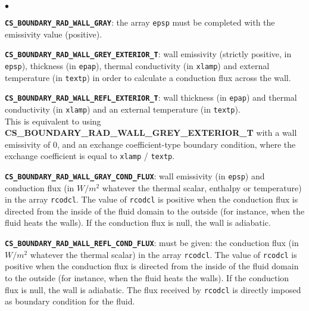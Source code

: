 \begin{list}{$\bullet$}{}

\item \texttt{\textbf{CS\_BOUNDARY\_RAD\_WALL\_GRAY}}: the array \texttt{epsp} must
      be completed with the emissivity value (positive).

\item \texttt{\textbf{CS\_BOUNDARY\_RAD\_WALL\_GREY\_EXTERIOR\_T}}: wall emissivity
      (strictly positive, in \texttt{epsp}), thickness (in \texttt{epap}),
      thermal conductivity (in \texttt{xlamp}) and external temperature
      (in \texttt{textp}) in order to calculate a conduction flux across the wall.

\item \texttt{\textbf{CS\_BOUNDARY\_RAD\_WALL\_REFL\_EXTERIOR\_T}}:
      wall thickness (in \texttt{epap}) and thermal
      conductivity (in \texttt{xlamp}) and an external temperature
      (in \texttt{textp}). \\
      This is equivalent to using \textbf{CS\_BOUNDARY\_RAD\_WALL\_GREY\_EXTERIOR\_T}
      with a wall emissivity of 0, and an exchange coefficient-type boundary
      condition, where the exchange coefficient is equal to
      \texttt{xlamp} / \texttt{textp}.

\item \texttt{\textbf{CS\_BOUNDARY\_RAD\_WALL\_GRAY\_COND\_FLUX}}:
      wall emissivity (in \texttt{epsp}) and conduction
      flux (in $W/m^2$ whatever the thermal scalar, enthalpy or temperature) in
      the array \texttt{rcodcl}. The value of \texttt{rcodcl} is positive when the
      conduction flux is directed from the inside of the fluid domain to the
      outside (for instance, when the fluid heats the walls). If the
      conduction flux is null, the wall is adiabatic.

\item \texttt{\textbf{CS\_BOUNDARY\_RAD\_WALL\_REFL\_COND\_FLUX}}:
      must be given: the conduction flux (in $W/m^2$ whatever the thermal
      scalar) in the array \texttt{rcodcl}. The value of \texttt{rcodcl} is
      positive when the conduction flux is directed from the inside of the
      fluid domain to the outside (for instance, when the fluid heats the
      walls). If the conduction flux is null, the wall is adiabatic. The flux
      received by \texttt{rcodcl} is directly imposed as boundary condition for
      the fluid.

\end{list}

